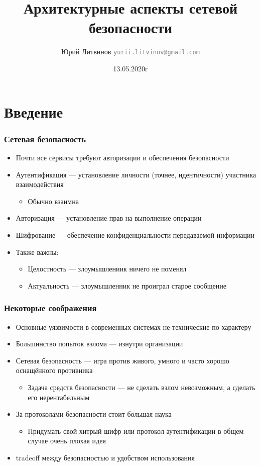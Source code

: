 \documentclass[xetex,mathserif,serif]{beamer}
\title{Архитектурные аспекты сетевой безопасности}
\author[Юрий Литвинов]{Юрий Литвинов \newline \textcolor{gray}{\small\texttt{yurii.litvinov@gmail.com}}}
\date{13.05.2020г}
\begin{document}
	\frame{\titlepage}

	\section{Введение}

	\begin{frame}
		\frametitle{Сетевая безопасность}
		\begin{itemize}
			\item Почти все сервисы требуют авторизации и обеспечения безопасности
			\item Аутентификация --- установление личности (точнее, идентичности) участника взаимодействия
			\begin{itemize}
				\item Обычно взаимна
			\end{itemize}
			\item Авторизация --- установление прав на выполнение операции
			\item Шифрование --- обеспечение конфиденциальности передаваемой информации
			\item Также важны:
			\begin{itemize}
				\item Целостность --- злоумышлениик ничего не поменял
				\item Актуальность --- злоумышленник не проиграл старое сообщение
			\end{itemize} 
		\end{itemize}
	\end{frame}

	\begin{frame}
		\frametitle{Некоторые соображения}
		\begin{itemize}
			\item Основные уязвимости в современных системах не технические по характеру
			\item Большинство попыток взлома --- изнутри организации
			\item Сетевая безопасность --- игра против живого, умного и часто хорошо оснащённого противника
			\begin{itemize}
				\item Задача средств безопасности --- не сделать взлом невозможным, а сделать его нерентабельным
			\end{itemize}
			\item За протоколами безопасности стоит большая наука
			\begin{itemize}
				\item Придумать свой хитрый шифр или протокол аутентификации в общем случае очень плохая идея
			\end{itemize} 
			\item tradeoff между безопасностью и удобством использования
		\end{itemize}
	\end{frame}
\end{document}
